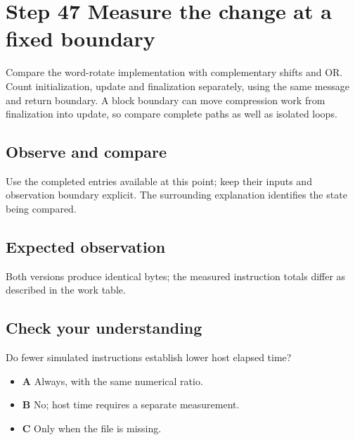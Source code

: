 \section{Step 47 Measure the change at a fixed boundary}\label{sha-s47}

Compare the word-rotate implementation with complementary shifts and OR. Count initialization, update and finalization separately, using the same message and return boundary. A block boundary can move compression work from finalization into update, so compare complete paths as well as isolated loops.

\subsection{Observe and compare}
Use the completed entries available at this point; keep their inputs and observation boundary explicit. The surrounding explanation identifies the state being compared.

\subsection{Expected observation}
Both versions produce identical bytes; the measured instruction totals differ as described in the work table.

\subsection{Check your understanding}
Do fewer simulated instructions establish lower host elapsed time?

\begin{itemize}
  \item \textbf{A} Always, with the same numerical ratio.
  \item \textbf{B} No; host time requires a separate measurement.
  \item \textbf{C} Only when the file is missing.
\end{itemize}
